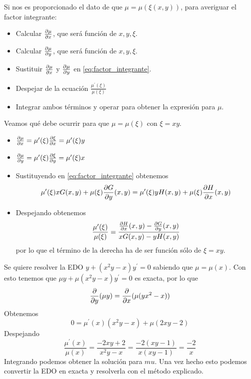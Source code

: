 \documentclass{mathnotes}
\begin{document}
\begin{method}
Si nos es proporcionado el dato de que $\mu = \mu(\xi(x,y))$, para averiguar el factor integrante:
\begin{itemize}
\item Calcular $\partialder{x}{\mu}$, que será función de $x,y,\xi$.
\item Calcular $\partialder{y}{\mu}$, que será función de $x,y,\xi$.
\item Sustituir $\partialder{x}{\mu}$ y $\partialder{y}{\mu}$ en \ref{eq:factor_integrante}.
\item Despejar de la ecuación $\frac{\mu^\prime(\xi)}{\mu(\xi)}$
\item Integrar ambos términos y operar para obtener la expresión para $\mu$.
\end{itemize}
\end{method}

\begin{example}
Veamos qué debe ocurrir para que $\mu = \mu(\xi)$ con $\xi = xy$.
\begin{itemize}
\item $\partialder{x}{\mu} = \mu^\prime(\xi)\partialder{x}{\xi} = \mu^\prime(\xi)y$
\item $\partialder{y}{\mu} = \mu^\prime(\xi)\partialder{y}{\xi} = \mu^\prime(\xi)x$
\item Sustituyendo en \ref{eq:factor_integrante} obtenemos $$\mu^\prime(\xi)xG(x,y)+\mu(\xi)\partialder{y}{G}(x,y) = \mu^\prime(\xi)yH(x,y)+\mu(\xi)\partialder{x}{H}(x,y)$$
\item Despejando obtenemos $$\frac{\mu^\prime(\xi)}{\mu(\xi)} = \frac{\partialder{x}{H}(x,y)-\partialder{y}{G}(x,y)}{xG(x,y)-yH(x,y)}$$ por lo que el término de la derecha ha de ser función sólo de $\xi=xy$.
\end{itemize}
\end{example}

\begin{example}
Se quiere resolver la EDO $y+(x^2y-x)y^\prime = 0$ sabiendo que $\mu = \mu(x)$. Con esto tenemos que $\mu y +\mu(x^2y-x)y^\prime = 0$ es exacta, por lo que $$\derivative{y}(\mu y) = \derivative{x} (\mu(yx^2-x))$$
Obtenemos $$0 = \mu^\prime(x)(x^2y-x)+\mu(2xy-2)$$
Despejando $$\frac{\mu^\prime(x)}{\mu(x)} = \frac{-2xy+2}{x^2y-x} = \frac{-2(xy-1)}{x(xy-1)} = \frac{-2}{x}$$
Integrando podemos obtener la solución para $mu$. Una vez hecho esto podemos convertir la EDO en exacta y resolverla con el método explicado.
\end{example}
\end{document}
